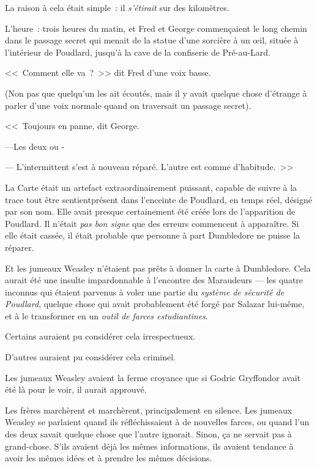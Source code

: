 La raison à cela était simple~: il \emph{s'étirait} sur des kilomètres.

L'heure~: trois heures du matin, et Fred et George commençaient le long chemin dans le passage secret qui menait de la statue d'une sorcière à un œil, située à l'intérieur de Poudlard, jusqu'à la cave de la confiserie de Pré-au-Lard.

<<~Comment elle va~?~>> dit Fred d'une voix basse.

(Non pas que quelqu'un les ait écoutés, mais il y avait quelque chose d'étrange à parler d'une voix normale quand on traversait un passage secret).

<<~Toujours en panne, dit George.

---Les deux ou -

--- L'intermittent s'est à nouveau réparé. L'autre est comme d'habitude.~>>

La Carte était un artefact extraordinairement puissant, capable de suivre à la trace tout être sentient\protect\footnotemark présent dans l'enceinte de Poudlard, en temps réel, désigné par son nom. Elle avait presque certainement été créée lors de l'apparition de Poudlard. Il n'était \emph{pas bon signe} que des erreurs commencent à apparaître. Si elle était cassée, il était probable que personne à part Dumbledore ne puisse la réparer.

Et les jumeaux Weasley n'étaient pas prêts à donner la carte à Dumbledore. Cela aurait été une insulte impardonnable à l'encontre des Maraudeurs — les quatre inconnus qui étaient parvenus à voler une partie du \emph{système de sécurité de Poudlard}, quelque chose qui avait probablement été forgé par Salazar lui-même, et à le transformer en un \emph{outil de farces estudiantines}.

Certains auraient pu considérer cela irrespectueux.

D'autres auraient pu considérer cela criminel.

Les jumeaux Weasley avaient la ferme croyance que si Godric Gryffondor avait été là pour le voir, il aurait approuvé.

Les frères marchèrent et marchèrent, principalement en silence. Les jumeaux Weasley se parlaient quand ils réfléchissaient à de nouvelles farces, ou quand l'un des deux savait quelque chose que l'autre ignorait. Sinon, ça ne servait pas à grand-chose. S'ils avaient déjà les mêmes informations, ils avaient tendance à avoir les mêmes idées et à prendre les mêmes décisions.

